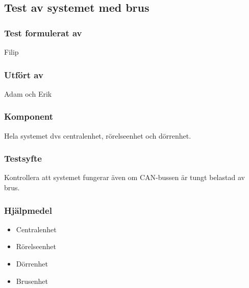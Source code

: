 \clearpage
\subsection{Test av systemet med brus}
\label{test:brusTest}

\setlength{\columnsep}{1cm}




\begin{multicols}{2}
\subsubsection*{Test formulerat av}
Filip

\subsubsection*{Utfört av}
Adam och Erik


\end{multicols}
\subsubsection*{Komponent}
Hela systemet dvs centralenhet, rörelseenhet och dörrenhet.


\subsubsection*{Testsyfte}
Kontrollera att systemet fungerar även om CAN-bussen är tungt belastad av brus.


\subsubsection*{Hjälpmedel}
\begin{itemize}
	\item Centralenhet
	\item Rörelseenhet
	\item Dörrenhet
	\item Brusenhet
\end{itemize}



